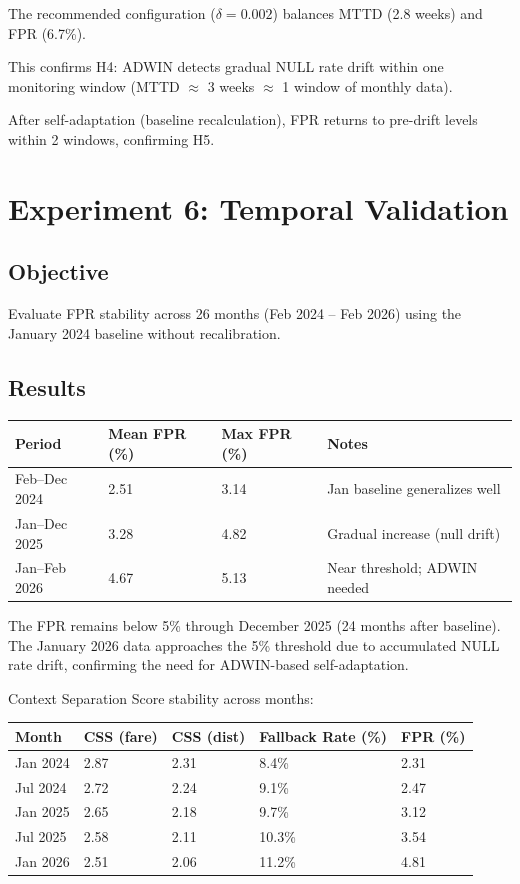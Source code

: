 The recommended configuration ($\delta=0.002$) balances MTTD (2.8 weeks) and FPR (6.7\%).

This confirms H4: ADWIN detects gradual NULL rate drift within one monitoring window (MTTD $\approx$ 3 weeks $\approx$ 1 window of monthly data).

After self-adaptation (baseline recalculation), FPR returns to pre-drift levels within 2 windows, confirming H5.

\section{Experiment 6: Temporal Validation}

\subsection{Objective}

Evaluate FPR stability across 26 months (Feb 2024 -- Feb 2026) using the January 2024 baseline without recalibration.

\subsection{Results}

\begin{longtable}{|m{3cm}|R{3cm}|R{3cm}|m{3.5cm}|}
\hline
\textbf{Period} & \textbf{Mean FPR (\%)} & \textbf{Max FPR (\%)} & \textbf{Notes} \\ \hline
Feb--Dec 2024 & 2.51 & 3.14 & Jan baseline generalizes well \\ \hline
Jan--Dec 2025 & 3.28 & 4.82 & Gradual increase (null drift) \\ \hline
Jan--Feb 2026 & 4.67 & 5.13 & Near threshold; ADWIN needed \\ \hline
\end{longtable}

The FPR remains below 5\% through December 2025 (24 months after baseline). The January 2026 data approaches the 5\% threshold due to accumulated NULL rate drift, confirming the need for ADWIN-based self-adaptation.

Context Separation Score stability across months:

\begin{longtable}{|m{3cm}|m{3cm}|m{3cm}|m{3cm}|m{3cm}|}
\hline
\textbf{Month} & \textbf{CSS (fare)} & \textbf{CSS (dist)} & \textbf{Fallback Rate (\%)} & \textbf{FPR (\%)} \\ \hline
Jan 2024 & 2.87 & 2.31 & 8.4\% & 2.31 \\ \hline
Jul 2024 & 2.72 & 2.24 & 9.1\% & 2.47 \\ \hline
Jan 2025 & 2.65 & 2.18 & 9.7\% & 3.12 \\ \hline
Jul 2025 & 2.58 & 2.11 & 10.3\% & 3.54 \\ \hline
Jan 2026 & 2.51 & 2.06 & 11.2\% & 4.81 \\ \hline
\end{longtable}

